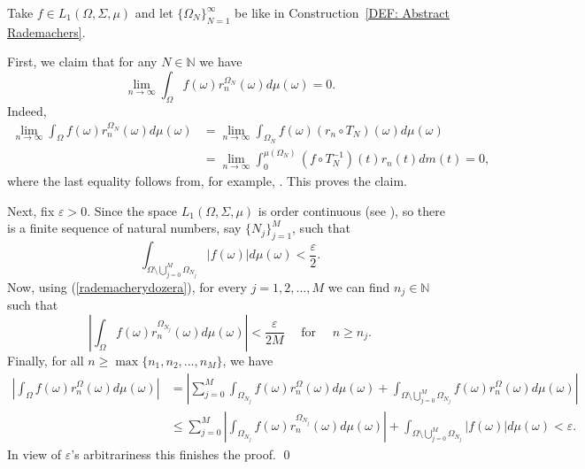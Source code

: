 \documentclass[11pt]{amsart}
\theoremstyle{definition}
\theoremstyle{definition}
\theoremstyle{definition}
\theoremstyle{definition}
\theoremstyle{definition}
\theoremstyle{definition}
\theoremstyle{definition}
\theoremstyle{definition}
\numberwithin{equation}{section}
\numberwithin{equation}{section}
\numberwithin{equation}{section}
\theoremstyle{definition}
\theoremstyle{definition}
\theoremstyle{definition}
\theoremstyle{definition}
\theoremstyle{definition}
\theoremstyle{definition}
\newcommand{\abs}[1]{\left\lvert#1\right\rvert}
\renewenvironment{proof}{\noindent {\bf Proof.}}{\qed}
\begin{document}
\begin{proof}
	Take $f \in L_1(\Omega,\Sigma,\mu)$ and let $\{\Omega_{N}\}_{N=1}^{\infty}$ be like in Construction~\ref{DEF: Abstract Rademachers}.
	
	First, we claim that for any $N \in \mathbb{N}$ we have 
	\begin{equation} \label{rademacherydozera} 
		\lim\limits_{n \rightarrow \infty} \int_{\Omega} f(\omega) r^{\Omega_N}_n(\omega) d\mu(\omega) = 0.
	\end{equation}
	Indeed,
	\begin{align*}
		\lim\limits_{n \rightarrow \infty} \int_{\Omega} f(\omega) r^{\Omega_N}_n(\omega) d\mu(\omega) &
		=\lim\limits_{n \rightarrow \infty} \int_{\Omega_N} f(\omega) \left( r_n \circ T_{N} \right)(\omega) d\mu(\omega) \\
		& = \lim\limits_{n \rightarrow \infty} \int_{0}^{\mu\left( \Omega_N \right)} \left( f \circ T_N^{-1} \right)(t) r_n(t) dm(t)  = 0,
	\end{align*}
	where the last equality follows from, for example, \cite[Lemma~3.2]{Kub14}. This proves the claim.
	
	Next, fix $\varepsilon>0$. Since the space $L_1(\Omega,\Sigma,\mu)$ is order continuous (see \cite[Theorem~5.5, p.~27]{BS88}),
	so there is a finite sequence of natural numbers, say $\{N_j\}_{j=1}^{M}$, such that
	\begin{equation*}
		\int_{\Omega\setminus \bigcup\limits_{j=0}^M\Omega_{N_j}}\abs{ f(\omega)} d\mu(\omega) < \frac{\varepsilon}{2}.
	\end{equation*}
	Now, using (\ref{rademacherydozera}), for every $j = 1, 2, ..., M$ we can find $n_j \in \mathbb{N}$ such that
	\begin{equation*}
		\abs{\int_{\Omega} f(\omega)r^{\Omega_{N_j}}_n(\omega) d\mu(\omega)} < \frac{\varepsilon}{2M} \quad \text{ for } \quad n \geqslant n_j.
	\end{equation*}
	Finally, for all $n \geqslant \max\{n_1,n_2,... , n_M\}$, we have
	\begin{align*}
		\abs{\int_{\Omega} f(\omega) r^{\Omega}_n(\omega) d\mu(\omega)} 
		&=\abs{\sum\limits_{j=0}^M\int_{\Omega_{N_j}} f(\omega) r^{\Omega}_n(\omega) d\mu(\omega)
			+\int_{\Omega\setminus \bigcup\limits_{j=0}^M\Omega_{N_j}} f(\omega)r^{\Omega}_n(\omega) d\mu(\omega)}\\
		&\leqslant\sum\limits_{j=0}^M\abs{\int_{\Omega_{N_j}} f(\omega) r^{\Omega_{N_j}}_n(\omega) d\mu(\omega)}
		+ \int_{\Omega\setminus \bigcup\limits_{j=0}^M\Omega_{N_j}}\abs{ f(\omega)} d\mu(\omega)
		< \varepsilon.
	\end{align*}
	In view of $\varepsilon$'s arbitrariness this finishes the proof.
\end{proof}
\end{document}
